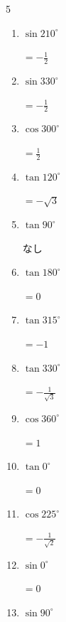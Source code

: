 \begin{multicols}{5}
\begin{enumerate}
        $\displaystyle =-\frac{1}{2}$

  \item $\displaystyle \sin{210^\circ}$

        $\displaystyle =-\frac{1}{2}$

  \item $\displaystyle \sin{330^\circ}$

        $\displaystyle =-\frac{1}{2}$

  \item $\displaystyle \cos{300^\circ}$

        $\displaystyle =\frac{1}{2}$

  \item $\displaystyle \tan{120^\circ}$

        $\displaystyle =-\sqrt{3}$

  \item $\displaystyle \tan{90^\circ}$

        $\displaystyle なし$

  \item $\displaystyle \tan{180^\circ}$

        $\displaystyle =0$

  \item $\displaystyle \tan{315^\circ}$

        $\displaystyle =-1$

  \item $\displaystyle \tan{330^\circ}$

        $\displaystyle =-\frac{1}{\sqrt{3}}$

\columnbreak %

  \item $\displaystyle \cos{360^\circ}$

        $\displaystyle =1$

  \item $\displaystyle \tan{0^\circ}$

        $\displaystyle =0$

  \item $\displaystyle \cos{225^\circ}$

        $\displaystyle =-\frac{1}{\sqrt{2}}$

  \item $\displaystyle \sin{0^\circ}$

        $\displaystyle =0$

  \item $\displaystyle \sin{90^\circ}$


\end{enumerate}
\end{multicols}
